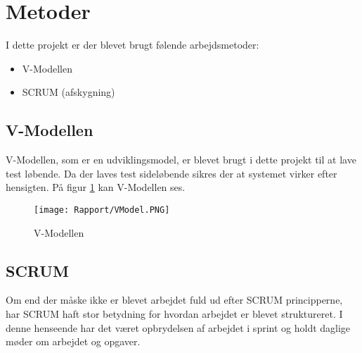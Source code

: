 \section{Metoder}

I dette projekt er der blevet brugt følende arbejdsmetoder:
\begin{itemize}
	\item V-Modellen
	\item SCRUM (afskygning)
	
\end{itemize}

\subsection{V-Modellen}

V-Modellen, som er en udviklingsmodel, er blevet brugt i dette projekt til at lave test løbende. Da der laves test sideløbende sikres der at systemet virker efter hensigten. På figur \ref{VModel} kan V-Modellen ses.

\begin{figure}[H]
	\centering
	\texttt{[image: Rapport/VModel.PNG]}
	\caption{V-Modellen}
	\label{VModel}
\end{figure} 


\subsection{SCRUM}
Om end der måske ikke er blevet arbejdet fuld ud efter SCRUM principperne, har SCRUM haft stor betydning for hvordan arbejdet er blevet struktureret. I denne henseende har det været opbrydelsen af arbejdet i sprint og holdt daglige møder om arbejdet og opgaver. 
